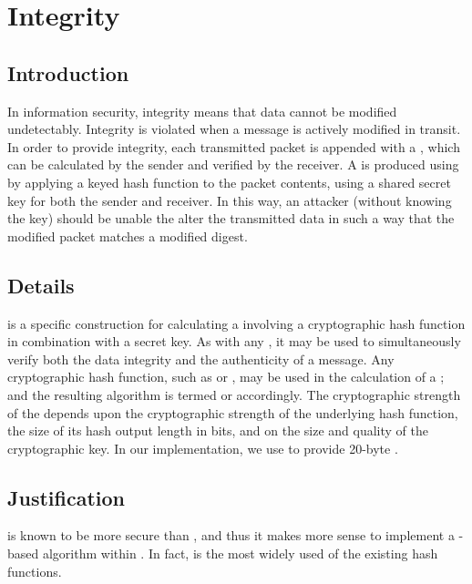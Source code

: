 \documentclass[a4paper,11pt]{article}
\begin{document}
\section{Integrity}

\subsection{Introduction}
In information security, integrity means that data cannot be modified 
undetectably. Integrity is violated when a message is actively modified in 
transit. In order to provide integrity, each transmitted packet is appended with
a , which can be calculated by the
sender and verified by the receiver. A  is produced using by 
applying a keyed hash function to the packet contents, using a shared secret key
for both the sender and receiver. In this way, an attacker (without knowing the 
key) should be unable the alter the transmitted data in such a way that the 
modified packet matches a modified  digest.

\subsection{Details}
 is a specific 
construction for calculating a  
involving a cryptographic hash function in combination with a secret key. As 
with any , it may be used to simultaneously verify both the data 
integrity and the authenticity of a message. Any cryptographic hash function, 
such as  or , may be used in the calculation of 
a ; and the resulting  algorithm is termed 
 or  accordingly. The cryptographic 
strength of the  depends upon the cryptographic strength of the 
underlying hash function, the size of its hash output length in bits, and on the
size and quality of the cryptographic key. In our implementation, we use 
 to provide 20-byte 
.

\subsection{Justification}
 is known to be more secure than , and thus it
makes more sense to implement a -based  
algorithm within \packageName{}. In fact,  is the most widely 
used of the existing  hash functions.
\end{document}
